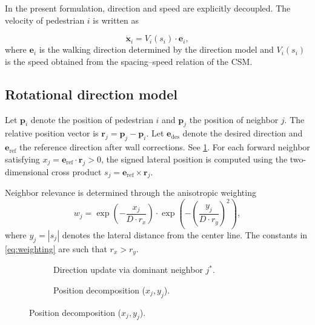 \documentclass[pdflatex,sn-mathphys-num]{sn-jnl}%
\theoremstyle{thmstyleone}%
\theoremstyle{thmstyletwo}%
\theoremstyle{thmstylethree}%
\begin{document}
\begin{appendices}
In the present formulation, direction and speed are explicitly decoupled.
The velocity of pedestrian $i$ is written as

\begin{equation}
\dot{\mathbf{x}}_i = V_i(s_i) \cdot \mathbf{e}_i,
\end{equation}
where $\mathbf{e}_i$ is the walking direction determined by the direction
model and $V_i(s_i)$ is the speed obtained from the spacing--speed relation
of the CSM.

\subsection{Rotational direction model}

Let $\mathbf{p}_i$ denote the position of pedestrian $i$ and
$\mathbf{p}_j$ the position of neighbor $j$. The relative position vector
is $\mathbf{r}_j = \mathbf{p}_j - \mathbf{p}_i$. Let
$\mathbf{e}_{\mathrm{des}}$ denote the desired direction and
$\mathbf{e}_{\mathrm{ref}}$ the reference direction after wall
corrections. See \cref{fig:direction}. For each forward neighbor
satisfying $x_j = \mathbf{e}_{\mathrm{ref}}\cdot\mathbf{r}_j > 0$, the
signed lateral position is computed using the two-dimensional cross product
$s_j = \mathbf{e}_{\mathrm{ref}} \times \mathbf{r}_j$.

Neighbor relevance is determined through the anisotropic weighting
\begin{equation}
w_j =
\exp\!\left(-\frac{x_j}{D\cdot r_x}\right)\cdot
\exp\!\left(-\left(\frac{y_j}{D\cdot r_y}\right)^2\right),
\label{eq:weighting}
\end{equation}
where $y_j = |s_j|$ denotes the lateral distance from the center line. The
constants in \cref{eq:weighting} are such that $r_x>r_y$.

\begin{figure}[htbp]
    \centering
    \begin{subfigure}[b]{0.48\textwidth}
        \centering
        
        \caption{Direction update via dominant neighbor $j^*$.}
        \label{fig:direction}
    \end{subfigure}
    \hfill
    \begin{subfigure}[b]{0.48\textwidth}
        \centering
        
        \caption{Position decomposition ($x_j, y_j$).}
        \label{fig:decomposition}
    \end{subfigure}
    

\end{figure}
\end{appendices}
\end{document}
